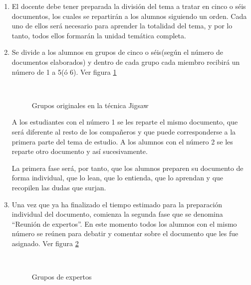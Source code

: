 \begin{enumerate}
  \item El docente debe tener preparada la división del tema a tratar en cinco o séis documentos, los cuales se repartirán a los alumnos siguiendo un orden. Cada uno de ellos será necesario para aprender la totalidad del tema, y por lo tanto, todos ellos formarán la unidad temática completa.
  \item Se divide a los alumnos en grupos de cinco o séis(según el número de documentos elaborados) y dentro de cada grupo cada miembro recibirá un número de 1 a 5(ó 6). Ver figura \ref{fig:jigsaw01}

\begin{figure}[h]
  \centering
  \\
  \caption{Grupos originales en la técnica Jigsaw}\label{fig:jigsaw01}
\end{figure}

A los estudiantes con el número 1 se les reparte el mismo documento, que será diferente al resto de los compañeros y que puede corresponderse a la primera parte del tema de estudio. A los alumnos con el número 2 se les reparte otro documento y así sucesivamente.

La primera fase será, por tanto, que los alumnos preparen su documento de forma individual, que lo lean, que lo entienda, que lo aprendan y que recopilen las dudas que surjan.

  \item Una vez que ya ha finalizado el tiempo estimado para la preparación individual del documento, comienza la segunda fase que se denomina ``Reunión de expertos''. En este momento todos los alumnos con el mismo número se reúnen para debatir y comentar sobre el documento que les fue asignado. Ver figura \ref{fig:jigsaw02}

  \begin{figure}[h]
  \centering
  \\
  \caption{Grupos de expertos}\label{fig:jigsaw02}
\end{figure}


\end{enumerate}
